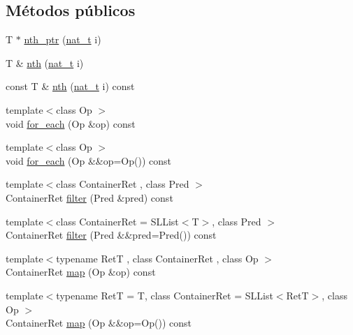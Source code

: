 \subsection*{Métodos públicos}
\begin{DoxyCompactItemize}
\item 
T $\ast$ \hyperlink{class_designar_1_1_container_algorithms_ae05e29e77ab6d57f7ae5e263bec475c6}{nth\+\_\+ptr} (\hyperlink{namespace_designar_aa72662848b9f4815e7bf31a7cf3e33d1}{nat\+\_\+t} i)
\item 
T \& \hyperlink{class_designar_1_1_container_algorithms_a519e813f4b2e787dfb7d743910ad3e4b}{nth} (\hyperlink{namespace_designar_aa72662848b9f4815e7bf31a7cf3e33d1}{nat\+\_\+t} i)
\item 
const T \& \hyperlink{class_designar_1_1_container_algorithms_aaf323d0085d4be2e234049b7ea77adf9}{nth} (\hyperlink{namespace_designar_aa72662848b9f4815e7bf31a7cf3e33d1}{nat\+\_\+t} i) const
\item 
{\footnotesize template$<$class Op $>$ }\\void \hyperlink{class_designar_1_1_container_algorithms_a32b1ccc6fc97faf17064b55e9224ba32}{for\+\_\+each} (Op \&op) const
\item 
{\footnotesize template$<$class Op $>$ }\\void \hyperlink{class_designar_1_1_container_algorithms_a5fc63764f264b91fd45fd275ecc0f27a}{for\+\_\+each} (Op \&\&op=Op()) const
\item 
{\footnotesize template$<$class Container\+Ret , class Pred $>$ }\\Container\+Ret \hyperlink{class_designar_1_1_container_algorithms_a8fde0ef12e4287386eccf48c381b7fca}{filter} (Pred \&pred) const
\item 
{\footnotesize template$<$class Container\+Ret  = S\+L\+List$<$\+T$>$, class Pred $>$ }\\Container\+Ret \hyperlink{class_designar_1_1_container_algorithms_a9ee9df4da794711c3639a3c86d905443}{filter} (Pred \&\&pred=Pred()) const
\item 
{\footnotesize template$<$typename RetT , class Container\+Ret , class Op $>$ }\\Container\+Ret \hyperlink{class_designar_1_1_container_algorithms_a3b9044a197e4ceec6a1de03de197a293}{map} (Op \&op) const
\item 
{\footnotesize template$<$typename RetT  = T, class Container\+Ret  = S\+L\+List$<$\+Ret\+T$>$, class Op $>$ }\\Container\+Ret \hyperlink{class_designar_1_1_container_algorithms_a9c49c11af28a3093dd133b65a115853b}{map} (Op \&\&op=Op()) const

\end{DoxyCompactItemize}
